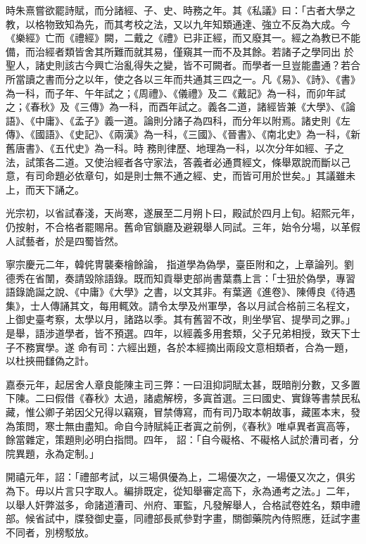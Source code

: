 \begin{pinyinscope}
 時朱熹嘗欲罷詩賦，而分諸經、子、史、時務之年。其《私議》曰：「古者大學之教，以格物致知為先，而其考校之法，又以九年知類通達、強立不反為大成。今《樂經》亡而《禮經》闕，二戴之《禮》已非正經，而又廢其一。經之為教已不能備，而治經者類皆舍其所難而就其易，僅窺其一而不及其餘。若諸子之學同出
 於聖人，諸史則該古今興亡治亂得失之變，皆不可闕者。而學者一旦豈能盡通？若合所當讀之書而分之以年，使之各以三年而共通其三四之一。凡《易》、《詩》、《書》為一科，而子年、午年試之；《周禮》、《儀禮》及二《戴記》為一科，而卯年試之；《春秋》及《三傳》為一科，而酉年試之。義各二道，諸經皆兼《大學》、《論語》、《中庸》、《孟子》義一道。論則分諸子為四科，而分年以附焉。諸史則《左傳》、《國語》、《史記》、《兩漢》為一科，《三國》、《晉書》、《南北史》為一科，《新舊唐書》、《五代史》為一科。時
 務則律歷、地理為一科，以次分年如經、子之法，試策各二道。又使治經者各守家法，答義者必通貫經文，條舉眾說而斷以己意，有司命題必依章句，如是則士無不通之經、史，而皆可用於世矣。」其議雖未上，而天下誦之。



 光宗初，以省試春淺，天尚寒，遂展至二月朔卜曰，殿試於四月上旬。紹熙元年，仍按射，不合格者罷賜帛。舊命官鎖廳及避親舉人同試。三年，始令分場，以革假人試藝者，於是四蜀皆然。



 寧宗慶元二年，韓侂冑襲秦檜餘論，
 指道學為偽學，臺臣附和之，上章論列。劉德秀在省闈，奏請毀除語錄。既而知貢舉吏部尚書葉翥上言：「士狃於偽學，專習語錄詭誕之說、《中庸》《大學》之書，以文其非。有葉適《進卷》、陳傅良《待遇集》，士人傳誦其文，每用輒效。請令太學及州軍學，各以月試合格前三名程文，上御史臺考察，太學以月，諸路以季。其有舊習不改，則坐學官、提學司之罪。」是舉，語涉道學者，皆不預選。四年，以經義多用套類，父子兄弟相授，致天下士子不務實學。遂
 命有司：六經出題，各於本經摘出兩段文意相類者，合為一題，以杜挾冊讎偽之計。



 嘉泰元年，起居舍人章良能陳主司三弊：一曰沮抑詞賦太甚，既暗削分數，又多置下陳。二曰假借《春秋》太過，諸處解榜，多寘首選。三曰國史、實錄等書禁民私藏，惟公卿子弟因父兄得以竊窺，冒禁傳寫，而有司乃取本朝故事，藏匿本末，發為策問，寒士無由盡知。命自今詩賦純正者寘之前例，《春秋》唯卓異者寘高等，餘當雜定，策題則必明白指問。四年，
 詔：「自今礙格、不礙格人試於漕司者，分院異題，永為定制。」



 開禧元年，詔：「禮部考試，以三場俱優為上，二場優次之，一場優又次之，俱劣為下。毋以片言只字取人。編排既定，從知舉審定高下，永為通考之法。」二年，以舉人奸弊滋多，命諸道漕司、州府、軍監，凡發解舉人，合格試卷姓名，類申禮部。候省試中，牒發御史臺，同禮部長貳參對字畫，關御藥院內侍照應，廷試字畫不同者，別榜駁放。




\end{pinyinscope}

